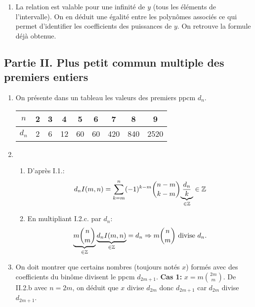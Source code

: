 \begin{enumerate}
\begin{enumerate}
 \item La relation est valable pour une infinité de $y$ (tous les éléments de l'intervalle). On en déduit une égalité entre les polynômes associés ce qui permet d'identifier les coefficients des puissances de $y$. On retrouve la formule déjà obtenue.  
\end{enumerate}

\end{enumerate}

\subsection*{Partie II. Plus petit commun multiple des premiers entiers}
\begin{enumerate}
 \item On présente dans un tableau les valeurs des premiers ppcm $d_n$.
\begin{center}
\renewcommand{\arraystretch}{1.2}
\begin{tabular}{|c|c|c|c|c|c|c|c|c|} \hline
$n$ & 2 & 3 & 4 & 5 & 6 & 7 & 8 & 9\\ \hline
$d_n$ & 2 & 6 & 12 & 60 & 60 & 420 & 840 & 2520 \\ \hline
\end{tabular}
\end{center}

 \item 
\begin{enumerate}
 \item D'après I.1.:
\begin{displaymath}
 d_nI(m,n) = \sum_{k=m}^n(-1)^{k-m}\binom{n-m}{k-m}\underset{\in \mathbb{Z}}{\underbrace{\frac{d_n}{k}}} \in \mathbb{Z}
\end{displaymath}

 \item  En multipliant I.2.c. par $d_n$:
\begin{displaymath}
 \underset{\in \mathbb{Z}}{\underbrace{m\binom{n}{m}}}\,\underset{\in \mathbb{Z}}{\underbrace{d_nI(m,n)}} = d_n 
 \Rightarrow m\binom{n}{m} \text{ divise } d_n. 
\end{displaymath}
\end{enumerate}

 \item  On doit montrer que certains nombres (toujours notés $x$) formés avec des coefficients du binôme divisent le ppcm $d_{2m+1}$.\newline 
\textbf{Cas 1: }$x=m\binom{2m}{m}$.\newline 
De II.2.b avec $n=2m$, on déduit que $x$ divise $d_{2m}$ donc $d_{2m+1}$ car $d_{2m}$ divise $d_{2m + 1}$. 


\end{enumerate}
